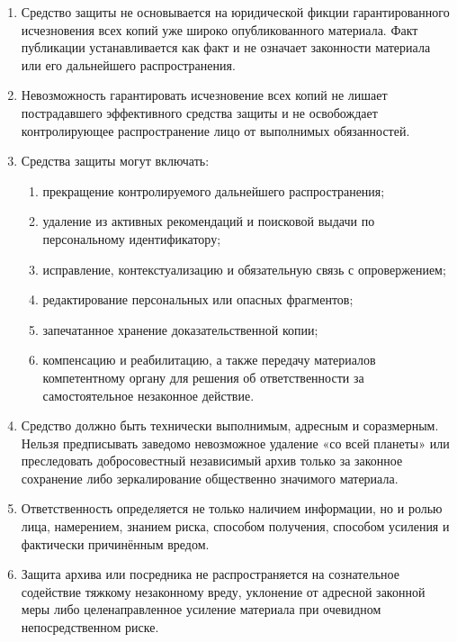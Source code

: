 \documentclass[
  russian,
  11pt,
  a4paper,
]{article}
\providecommand{\tightlist}{%
  \setlength{\itemsep}{0pt}\setlength{\parskip}{0pt}}
\begin{document}
\begin{enumerate}
\def\labelenumi{\arabic{enumi}.}
\tightlist
\item
  Средство защиты не основывается на юридической фикции гарантированного
  исчезновения всех копий уже широко опубликованного материала. Факт
  публикации устанавливается как факт и не означает законности материала
  или его дальнейшего распространения.
\item
  Невозможность гарантировать исчезновение всех копий не лишает
  пострадавшего эффективного средства защиты и не освобождает
  контролирующее распространение лицо от выполнимых обязанностей.
\item
  Средства защиты могут включать:

  \begin{enumerate}
  \def\labelenumii{\arabic{enumii}.}
  \tightlist
  \item
    прекращение контролируемого дальнейшего распространения;
  \item
    удаление из активных рекомендаций и поисковой выдачи по
    персональному идентификатору;
  \item
    исправление, контекстуализацию и обязательную связь с опровержением;
  \item
    редактирование персональных или опасных фрагментов;
  \item
    запечатанное хранение доказательственной копии;
  \item
    компенсацию и реабилитацию, а также передачу материалов
    компетентному органу для решения об ответственности за
    самостоятельное незаконное действие.
  \end{enumerate}
\item
  Средство должно быть технически выполнимым, адресным и соразмерным.
  Нельзя предписывать заведомо невозможное удаление «со всей планеты»
  или преследовать добросовестный независимый архив только за законное
  сохранение либо зеркалирование общественно значимого материала.
\item
  Ответственность определяется не только наличием информации, но и ролью
  лица, намерением, знанием риска, способом получения, способом усиления
  и фактически причинённым вредом.
\item
  Защита архива или посредника не распространяется на сознательное
  содействие тяжкому незаконному вреду, уклонение от адресной законной
  меры либо целенаправленное усиление материала при очевидном
  непосредственном риске.
\end{enumerate}
\end{document}
